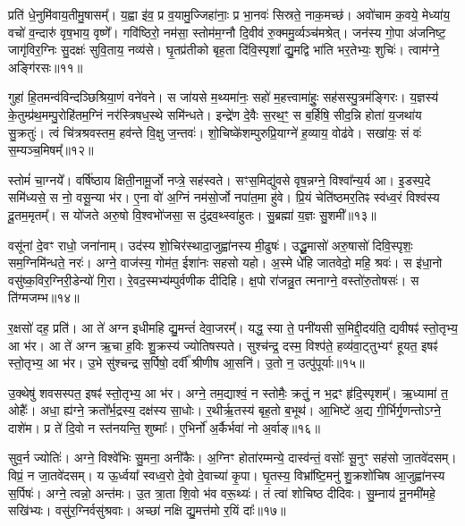 प्रति॑ धे॒नुमि॑वाय॒तीमु॒षासम्᳚। य॒ह्वा इ॑व॒ प्र व॒यामु॒ज्जिहा॑नाः॒ प्र भा॒नवः॑ सिस्रते॒ नाक॒मच्छ॑। अवो॑चाम क॒वये॒ मेध्या॑य॒ वचो॑ व॒न्दारु॑ वृष॒भाय॒ वृष्णे᳚। गवि॑ष्ठिरो॒ नम॑सा॒ स्तोम॑म॒ग्नौ दि॒वीव॑ रु॒क्ममु॒र्व्यञ्च॑मश्रेत्। जन॑स्य गो॒पा अ॑जनिष्ट॒ जागृ॑विर॒ग्निः सु॒दक्षः॑ सुवि॒ताय॒ नव्य॑से। घृ॒तप्र॑तीको बृह॒ता दि॑वि॒स्पृशा᳚ द्यु॒मद्वि भा॑ति भर॒तेभ्यः॒ शुचिः॑। त्वाम॑ग्ने॒ अङ्गि॑रसः॥११॥

गुहा॑ हि॒तमन्व॑विन्दञ्छिश्रिया॒णं वने॑वने। स जा॑यसे म॒थ्यमा॑नः॒ सहो॑ म॒हत्त्वामा॑हुः॒ सह॑सस्पु॒त्रम॑ङ्गिरः। य॒ज्ञस्य॑ के॒तुम्प्र॑थ॒मम्पु॒रोहि॑तम॒ग्निं नर॑स्त्रिषध॒स्थे समि॑न्धते। इन्द्रे॑ण दे॒वैः स॒रथ॒ꣳ॒ स ब॒र्\mbox{}हिषि॒ सीद॒न्नि होता॑ य॒जथा॑य सु॒क्रतुः॑। त्वं चि॑त्रश्रवस्तम॒ हव॑न्ते वि॒क्षु ज॒न्तवः॑। शो॒चिष्के॑शम्पुरुप्रि॒याग्ने॑ ह॒व्याय॒ वोढ॑वे। सखा॑यः॒ सं वः॑ स॒म्यञ्च॒मिषम्᳚॥१२॥

स्तोमं॑ चा॒ग्नये᳚। वर्\mbox{}षि॑ष्ठाय क्षिती॒नामू॒र्जो नप्त्रे॒ सह॑स्वते। सꣳस॒मिद्यु॑वसे वृष॒न्नग्ने॒ विश्वा᳚न्य॒र्य आ। इ॒डस्प॒दे समि॑ध्यसे॒ स नो॒ वसू॒न्या भ॑र। ए॒ना वो॑ अ॒ग्निं नम॑सो॒र्जो नपा॑त॒मा हु॑वे। प्रि॒यं चेति॑ष्ठमर॒तिꣴ स्व॑ध्व॒रं विश्व॑स्य दू॒तम॒मृतम्᳚। स यो॑जते अरु॒षो वि॒श्वभो॑जसा॒ स दु॑द्रव॒थ्स्वा॑हुतः। सु॒ब्रह्मा॑ य॒ज्ञः सु॒शमी᳚॥१३॥

वसू॑नां दे॒वꣳ राधो॒ जना॑नाम्। उद॑स्य शो॒चिर॑स्थादा॒जुह्वा॑नस्य मी॒ढुषः॑। उद्धू॒मासो॑ अरु॒षासो॑ दिवि॒स्पृशः॒ सम॒ग्निमि॑न्धते॒ नरः॑। अग्ने॒ वाज॑स्य॒ गोम॑त॒ ईशा॑नः सहसो यहो। अ॒स्मे धे॑हि जातवेदो॒ महि॒ श्रवः॑। स इ॑धा॒नो वसु॑ष्क॒विर॒ग्निरी॒डेन्यो॑ गि॒रा। रे॒वद॒स्मभ्य॑म्पुर्वणीक दीदिहि। क्ष॒पो रा॑जन्नु॒त त्मनाग्ने॒ वस्तो॑रु॒तोषसः॑। स ति॑ग्मजम्भ॥१४॥

र॒क्षसो॑ दह॒ प्रति॑। आ ते॑ अग्न इधीमहि द्यु॒मन्तं॑ देवा॒जरम्᳚। यद्ध॒ स्या ते॒ पनी॑यसी स॒मिद्दी॒दय॑ति॒ द्यवीषꣴ॑ स्तो॒तृभ्य॒ आ भ॑र। आ ते॑ अग्न ऋ॒चा ह॒विः शु॒क्रस्य॑ ज्योतिषस्पते। सुश्च॑न्द्र॒ दस्म॒ विश्प॑ते॒ हव्य॑वा॒ट्तुभ्यꣳ॑ हूयत॒ इषꣴ॑ स्तो॒तृभ्य॒ आ भ॑र। उ॒भे सु॑श्चन्द्र स॒र्पिषो॒ दर्वी᳚ श्रीणीष आ॒सनि॑। उ॒तो न॒ उत्पु॑पूर्याः॥१५॥

उ॒क्थेषु॑ शवसस्पत॒ इषꣴ॑ स्तो॒तृभ्य॒ आ भ॑र। अग्ने॒ तम॒द्याश्वं॒ न स्तोमैः॒ क्रतुं॒ न भ॒द्रꣳ हृ॑दि॒स्पृशम्᳚। ऋ॒ध्यामा॑ त॒ ओहैः᳚। अधा॒ ह्य॑ग्ने॒ क्रतो᳚र्भ॒द्रस्य॒ दक्ष॑स्य सा॒धोः। र॒थीर्\mbox{}ऋ॒तस्य॑ बृह॒तो ब॒भूथ॑। आ॒भिष्टे॑ अ॒द्य गी॒र्भिर्गृ॒णन्तो\-ऽग्ने॒ दाशे॑म। प्र ते॑ दि॒वो न स्त॑नयन्ति॒ शुष्माः᳚। ए॒भिर्नो॑ अ॒र्कैर्भवा॑ नो अ॒र्वाङ्॥१६॥

सुव॒र्न ज्योतिः॑। अग्ने॒ विश्वे॑भिः सु॒मना॒ अनी॑कैः। अ॒ग्निꣳ होता॑रम्मन्ये॒ दास्व॑न्तं॒ वसोः᳚ सू॒नुꣳ सह॑सो जा॒तवे॑दसम्। विप्रं॒ न जा॒तवे॑दसम्। य ऊ॒र्ध्वया᳚ स्वध्व॒रो दे॒वो दे॒वाच्या॑ कृ॒पा। घृ॒तस्य॒ विभ्रा᳚ष्टि॒मनु॑ शु॒क्रशो॑चिष आ॒जुह्वा॑नस्य स॒र्पिषः॑। अग्ने॒ त्वन्नो॒ अन्त॑मः। उ॒त त्रा॒ता शि॒वो भ॑व वरू॒थ्यः॑। तं त्वा॑ शोचिष्ठ दीदिवः। सु॒म्नाय॑ नू॒नमी॑महे॒ सखि॑भ्यः। वसु॑र॒ग्निर्वसु॑श्रवाः। अच्छा॑ नक्षि द्यु॒मत्त॑मो र॒यिं दाः᳚॥१७॥

